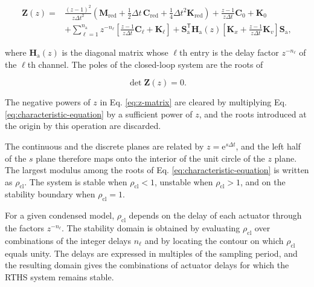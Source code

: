 \documentclass[a4paper,fleqn,review,12pt]{cas-sc}
\begin{document}
\vspace{-3.0em}
\begin{equation}
	\begin{aligned}
		\mathbf{Z}(z)={}&
		\frac{(z-1)^{2}}{z\Delta t^{2}}
		\left(\mathbf{M}_{\mathrm{red}}
		+\tfrac{1}{2}\Delta t\,\mathbf{C}_{\mathrm{red}}
		+\tfrac{1}{4}\Delta t^{2}\mathbf{K}_{\mathrm{red}}\right)
		+\frac{z-1}{z\Delta t}\mathbf{C}_{0}+\mathbf{K}_{0}\\
		&+\sum_{\ell=1}^{n_{\mathrm{a}}}z^{-n_{\ell}}
		\left[
		\frac{z-1}{z\Delta t}\mathbf{C}_{\ell}+\mathbf{K}_{\ell}
		\right]
		+\mathbf{S}_{\mathrm{a}}^{\mathsf{T}}\mathbf{H}_{\mathrm{a}}(z)
		\left[
		\mathbf{K}_{x}+\frac{z-1}{z\Delta t}\mathbf{K}_{v}
		\right]\mathbf{S}_{\mathrm{a}},
	\end{aligned}
	\label{eq:z-matrix}
\end{equation}
\vspace{-2.5em}

\noindent where \(\mathbf{H}_{\mathrm{a}}(z)\) is the diagonal matrix whose \(\ell\)th entry is the delay factor \(z^{-n_{\ell}}\) of the \(\ell\)th channel. The poles of the closed-loop system are the roots of

\vspace{-3.5em}
\begin{equation}
	\det\mathbf{Z}(z)=0.
	\label{eq:characteristic-equation}
\end{equation}
\vspace{-3.5em}

The negative powers of \(z\) in Eq. \eqref{eq:z-matrix} are cleared by multiplying Eq. \eqref{eq:characteristic-equation} by a sufficient power of \(z\), and the roots introduced at the origin by this operation are discarded.

The continuous and the discrete planes are related by \(z=\mathrm{e}^{s\Delta t}\), and the left half of the \(s\) plane therefore maps onto the interior of the unit circle of the \(z\) plane. The largest modulus among the roots of Eq. \eqref{eq:characteristic-equation} is written as \(\rho_{\mathrm{cl}}\). The system is stable when \(\rho_{\mathrm{cl}}<1\), unstable when \(\rho_{\mathrm{cl}}>1\), and on the stability boundary when \(\rho_{\mathrm{cl}}=1\).

For a given condensed model, \(\rho_{\mathrm{cl}}\) depends on the delay of each actuator through the factors \(z^{-n_{\ell}}\). The stability domain is obtained by evaluating \(\rho_{\mathrm{cl}}\) over combinations of the integer delays \(n_{\ell}\) and by locating the contour on which \(\rho_{\mathrm{cl}}\) equals unity. The delays are expressed in multiples of the sampling period, and the resulting domain gives the combinations of actuator delays for which the RTHS system remains stable.
\end{document}
